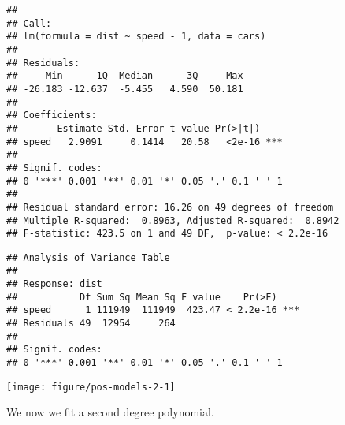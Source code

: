 \documentclass[paper=a4,10pt,div=17,headsepline,BCOR=12mm,twoside,open=right]{scrbook}\usepackage{knitr}
\begin{document}
\begin{knitrout}\footnotesize
{}\color{fgcolor}\begin{kframe}
\begin{alltt}
 \hlkwb{<-}  \hlopt{~}  \hlopt{-} \hlstd{,}  
  \hlstd{=} \hlstd{)} 
 
\end{alltt}
\begin{verbatim}
## 
## Call:
## lm(formula = dist ~ speed - 1, data = cars)
## 
## Residuals:
##     Min      1Q  Median      3Q     Max 
## -26.183 -12.637  -5.455   4.590  50.181 
## 
## Coefficients:
##       Estimate Std. Error t value Pr(>|t|)    
## speed   2.9091     0.1414   20.58   <2e-16 ***
## ---
## Signif. codes:  
## 0 '***' 0.001 '**' 0.01 '*' 0.05 '.' 0.1 ' ' 1
## 
## Residual standard error: 16.26 on 49 degrees of freedom
## Multiple R-squared:  0.8963,	Adjusted R-squared:  0.8942 
## F-statistic: 423.5 on 1 and 49 DF,  p-value: < 2.2e-16
\end{verbatim}
\begin{alltt}
 
\end{alltt}
\begin{verbatim}
## Analysis of Variance Table
## 
## Response: dist
##           Df Sum Sq Mean Sq F value    Pr(>F)    
## speed      1 111949  111949  423.47 < 2.2e-16 ***
## Residuals 49  12954     264                      
## ---
## Signif. codes:  
## 0 '***' 0.001 '**' 0.01 '*' 0.05 '.' 0.1 ' ' 1
\end{verbatim}
\end{kframe}

{\centering \texttt{[image: figure/pos-models-2-1]} 

}



\end{knitrout}

We now we fit a second degree polynomial.
\end{document}
